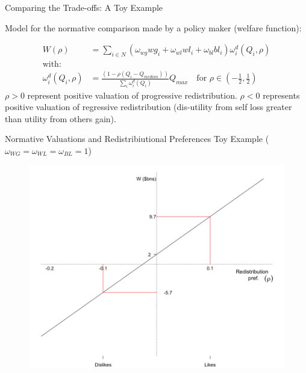 \documentclass{beamer}
\begin{document}
\begin{frame}{Comparing the Trade-offs: A Toy Example}

Model for the normative comparison made by a policy maker (welfare function):

\begin{align*}
W(\rho) &= \sum_{i \in N} \left( \omega_{wg}  wg_{i} + \omega_{wl} wl_{i} + \omega_{bl} bl_{i} \right) \omega^{d}_{i}(Q_{i}, \rho) \\
\text{with:}& \nonumber \\
\omega^{d}_{i}(Q_{i}, \rho) &= \frac{(1 - \rho(Q_{i} - Q_{median}) ) }{\sum_{i} \omega^{d}_{i}(Q_{i}) } Q_{max} \quad \text{for }  \rho \in \left(-\frac{1}{2}, \frac{1}{2} \right) \nonumber
\end{align*}
$\rho>0$ represent positive valuation of progressive redistribution. $\rho<0$ represents positive valuation of regressive redistribution (dis-utility from self loss greater than utility from others gain). 
\end{frame}


\begin{frame}{\hspace*{-2em} Normative Valuations and Redistribiutional Preferences  \linebreak \vspace*{-1em} Toy Example ({ $\omega_{WG} = \omega_{WL} = \omega_{BL} = 1$}) }

\vspace{-.2em}
\begin{figure}[h!]
\centering
\includegraphics[scale = 0.35]{../Images/sample_pref}
\label{toy_ex}
\end{figure}	
\end{frame}
\end{document}
